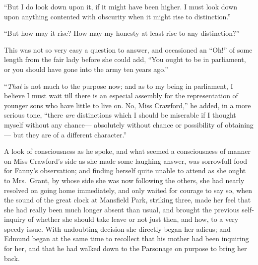 \documentclass{article}
\begin{document}
``But I do look down upon it, if it might have been higher.
I must look down upon anything contented with obscurity
when it might rise to distinction.''

``But how may it rise?  How may my honesty at least rise
to any distinction?''

This was not so very easy a question to answer,
and occasioned an ``Oh!'' of some length from the fair lady
before she could add, ``You ought to be in parliament,
or you should have gone into the army ten years ago.''

``\emph{That} is not much to the purpose now; and as to my being
in parliament, I believe I must wait till there is an
especial assembly for the representation of younger sons
who have little to live on.  No, Miss Crawford,'' he added,
in a more serious tone, ``there \emph{are} distinctions which I
should be miserable if I thought myself without any chance---%
absolutely without chance or possibility of obtaining---%
but they are of a different character.''

A look of consciousness as he spoke, and what seemed
a consciousness of manner on Miss Crawford's side
as she made some laughing answer, was sorrowfull food
for Fanny's observation; and finding herself quite
unable to attend as she ought to Mrs.\ Grant, by whose
side she was now following the others, she had nearly
resolved on going home immediately, and only waited
for courage to say so, when the sound of the great clock
at Mansfield Park, striking three, made her feel that she
had really been much longer absent than usual, and brought
the previous self-inquiry of whether she should take
leave or not just then, and how, to a very speedy issue.
With undoubting decision she directly began her adieus;
and Edmund began at the same time to recollect that
his mother had been inquiring for her, and that he
had walked down to the Parsonage on purpose to bring her back.
\end{document}
